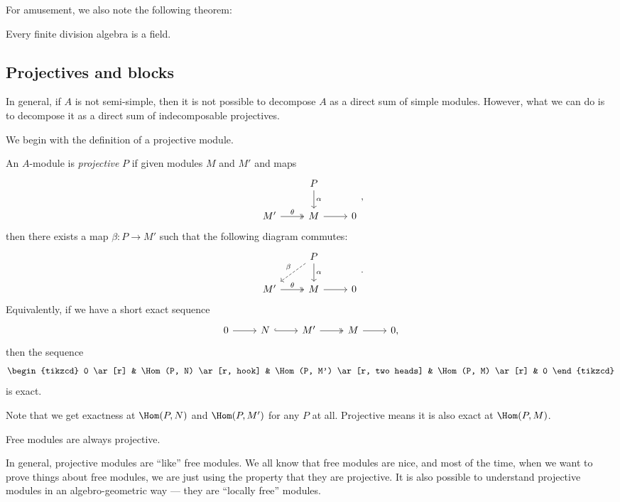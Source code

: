 \documentclass[a4paper]{article}
\begin{document}
For amusement, we also note the following theorem:

\begin{fact}[Wedderburn]
  Every finite division algebra is a field.
\end{fact}

\subsection{Projectives and blocks}
In general, if $A$ is not semi-simple, then it is not possible to decompose $A$ as a direct sum of simple modules. However, what we can do is to decompose it as a direct sum of indecomposable projectives.

We begin with the definition of a projective module.

\begin{defi}
  An $A$-module is \emph{projective} $P$ if given modules $M$ and $M'$ and maps
  \[
    \begin{tikzcd}
      & P \ar[d, "\alpha"]\\
      M' \ar[r, two heads, "\theta"] & M \ar[r] & 0
    \end{tikzcd},
  \]
  then there exists a map $\beta: P \to M'$ such that the following diagram commutes:
  \[
    \begin{tikzcd}
      & P \ar[d, "\alpha"] \ar[ld, dashed, "\beta"']\\
      M' \ar[r, two heads, "\theta"] & M \ar[r] & 0
    \end{tikzcd}.
  \]
  Equivalently, if we have a short exact sequence
  \[
    \begin{tikzcd}
      0 \ar[r] & N \ar[r, hook] & M' \ar[r, two heads] & M \ar[r] & 0,
    \end{tikzcd}
  \]
  then the sequence
  \[
    \begin{tikzcd}
      0 \ar[r] & \Hom(P, N) \ar[r, hook] & \Hom(P, M') \ar[r, two heads] & \Hom(P, M) \ar[r] & 0
    \end{tikzcd}
  \]
  is exact.
\end{defi}
Note that we get exactness at $\Hom(P, N)$ and $\Hom(P, M')$ for any $P$ at all. Projective means it is also exact at $\Hom(P, M)$.

\begin{eg}
  Free modules are always projective.
\end{eg}
In general, projective modules are ``like'' free modules. We all know that free modules are nice, and most of the time, when we want to prove things about free modules, we are just using the property that they are projective. It is also possible to understand projective modules in an algebro-geometric way --- they are ``locally free'' modules.
\end{document}
